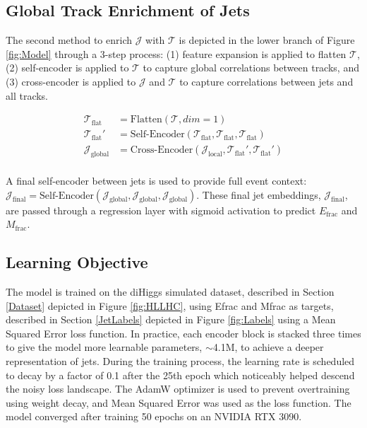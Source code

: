 \subsection{Global Track Enrichment of Jets} \hfill

The second method to enrich $\mathcal{J}$ with $\mathcal{T}$ is depicted in the lower branch of Figure \ref{fig:Model} through a 3-step process: (1) feature expansion is applied to flatten $\mathcal{T}$, (2) self-encoder is applied to $\mathcal{T}$ to capture global correlations between tracks, and (3) cross-encoder is applied to $\mathcal{J}$ and $\mathcal{T}$ to capture correlations between jets and all tracks.

\begin{align}
  \mathcal{T}_\text{flat}&=\text{Flatten}(\mathcal{T},dim=1) \\
  \mathcal{T}_\text{flat}' &= \text{Self-Encoder}(\mathcal{T}_\text{flat},\mathcal{T}_\text{flat},\mathcal{T}_\text{flat}) \\
  \mathcal{J}_\text{global} &= \text{Cross-Encoder}(\mathcal{J}_\text{local},\mathcal{T}_\text{flat}',\mathcal{T}_\text{flat}') \\
\end{align}

A final self-encoder between jets is used to provide full event context: $\mathcal{J}_\text{final} = \text{Self-Encoder}(\mathcal{J}_\text{global},\mathcal{J}_\text{global},\mathcal{J}_\text{global}) $. These final jet embeddings, \(\mathcal{J}_{\text{final}}\), are passed through a regression layer with sigmoid activation to predict $E_{\text{frac}}$ and $M_{\text{frac}}$.

\subsection{Learning Objective}\hfill

The model is trained on the diHiggs simulated dataset, described in Section \ref{Dataset} depicted in Figure \ref{fig:HLLHC}, using Efrac and Mfrac as targets, described in Section \ref{JetLabels} depicted in Figure \ref{fig:Labels} using a Mean Squared Error loss function. In practice, each encoder block is stacked three times to give the model more learnable parameters, $\sim$4.1M,  to achieve a deeper representation of jets. During the training process, the learning rate is scheduled to decay by a factor of 0.1 after the 25th epoch which noticeably helped descend the noisy loss landscape. The AdamW optimizer is used to prevent overtraining using weight decay, and Mean Squared Error was used as the loss function. The model converged after training 50 epochs on an NVIDIA RTX 3090.


